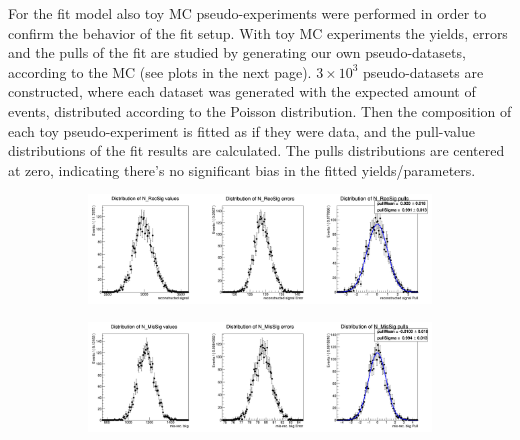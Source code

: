 \noindent For the fit model also toy MC pseudo-experiments were
performed in order to confirm the behavior of the fit setup.  With toy MC experiments the yields, errors and the pulls of the fit are studied  by generating our own pseudo-datasets, according to the MC (see plots in the next page). 
 $3\times10^3$ pseudo-datasets are constructed, where each dataset was generated with the expected amount of events, distributed according to the Poisson distribution. Then the composition of each toy pseudo-experiment is fitted as if they were data, and the pull-value distributions of the fit results are calculated.
 The pulls distributions are centered at zero, indicating there's no significant bias in the fitted yields/parameters.
\newpage


\begin{figure}[H]
  \begin{subfigure}{14.5cm}
    \centering\includegraphics[width=13.8cm]{04-chargedCorrBtoLambda/figs/NrecSig_mcstudy.png}
  \end{subfigure}
  \begin{subfigure}{14.5cm}
    \centering\includegraphics[width=13.8cm]{04-chargedCorrBtoLambda/figs/NmisSig_mcstudy.png}
  \end{subfigure}
 

\end{figure}
